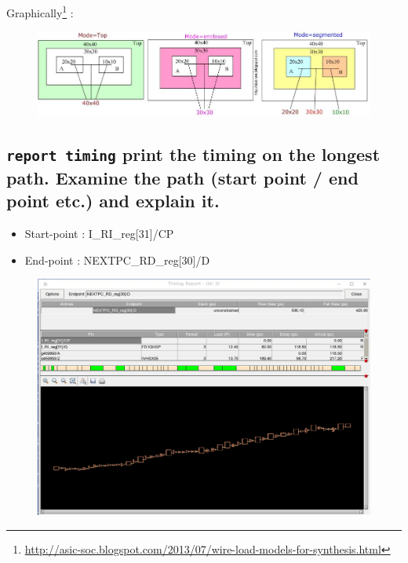 \documentclass[11pt,a4paper,sans,dvipsnames]{report}
\begin{document}
	\par Graphically\footnote{\url{http://asic-soc.blogspot.com/2013/07/wire-load-models-for-synthesis.html}} :

	\begin{figure}[h!]
		\centering
		\includegraphics[width=\linewidth]{images/WLM.jpg}
		\label{fig:WLM}
	\end{figure}

	\newpage
	\subsection*{ \texttt{report timing} print the timing on the longest path. Examine the path (start point / end point etc.) and explain it.}
	\begin{itemize}
		\item Start-point  : I\_RI\_reg[31]/CP
		\item End-point    : NEXTPC\_RD\_reg[30]/D
	\end{itemize} 


	\begin{figure}[h!]
		\centering
		\includegraphics[width=\linewidth]{images/longestpath.png}
		\label{fig:WLM}
	\end{figure}
\end{document}
